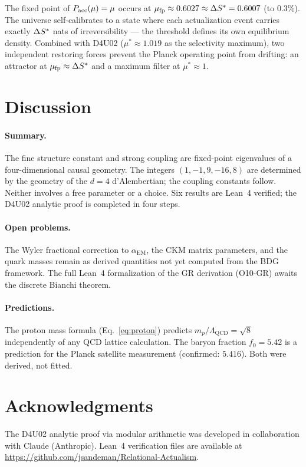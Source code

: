 \documentclass[12pt,a4paper]{article}
\begin{document}
The fixed point of $P_{\mathrm{acc}}(\mu) = \mu$ occurs at $\mu_{\mathrm{fp}} \approx 0.6027 \approx \Delta S^* = 0.6007$ (to $0.3\%$).  The universe self-calibrates to a state where each actualization event carries exactly $\Delta S^*$ nats of irreversibility — the threshold defines its own equilibrium density.  Combined with D4U02 ($\mu^* \approx 1.019$ as the selectivity maximum), two independent restoring forces prevent the Planck operating point from drifting: an attractor at $\mu_{\mathrm{fp}} \approx \Delta S^*$ and a maximum filter at $\mu^* \approx 1$.

\section{Discussion}\label{sec:discussion}

\paragraph{Summary.}  The fine structure constant and strong coupling are fixed-point eigenvalues of a four-dimensional causal geometry.  The integers $(1,-1,9,-16,8)$ are determined by the geometry of the $d=4$ d'Alembertian; the coupling constants follow.  Neither involves a free parameter or a choice.  Six results are Lean~4 verified; the D4U02 analytic proof is completed in four steps.

\paragraph{Open problems.}  The Wyler fractional correction to $\alpha_{\mathrm{EM}}$, the CKM matrix parameters, and the quark masses remain as derived quantities not yet computed from the BDG framework.  The full Lean~4 formalization of the GR derivation (O10-GR) awaits the discrete Bianchi theorem.

\paragraph{Predictions.}  The proton mass formula (Eq.~\ref{eq:proton}) predicts $m_p/\Lambda_{\text{QCD}} = \sqrt{8}$ independently of any QCD lattice calculation.  The baryon fraction $f_0 = 5.42$ is a prediction for the Planck satellite measurement (confirmed: $5.416$).  Both were derived, not fitted.

\section*{Acknowledgments}
The D4U02 analytic proof via modular arithmetic was developed in collaboration with Claude (Anthropic).  Lean~4 verification files are available at \url{https://github.com/jsandeman/Relational-Actualism}.
\end{document}

